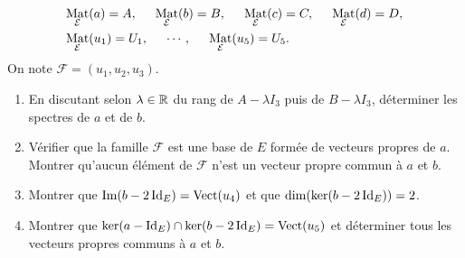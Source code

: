 \begin{align*}
&\mathop{\mathrm{Mat}}_{\mathcal E}(a) = A,\hspace{0.5cm} \mathop{\mathrm{Mat}}_{\mathcal E}(b) = B,\hspace{0.5cm}
\mathop{\mathrm{Mat}}_{\mathcal E}(c) = C,\hspace{0.5cm} \mathop{\mathrm{Mat}}_{\mathcal E}(d) = D,\; \\
&\mathop{\mathrm{Mat}}_{\mathcal E}(u_1) = U_1,\hspace{0.5cm}\cdots ,\hspace{0.5cm} \mathop{\mathrm{Mat}}_{\mathcal E}(u_5) = U_5.
\end{align*}
On note $\mathcal{F} = (u_1,u_2,u_3)$.
\begin{enumerate}
 \item En discutant selon $\lambda \in \mathbb{R}$ du rang de $A-\lambda I_3$ puis de $B-\lambda I_3$, déterminer les spectres de $a$ et de $b$.
 \item Vérifier que la famille $\mathcal{F}$ est une base de $E$ formée de vecteurs propres de $a$. Montrer qu'aucun élément de $\mathcal{F}$ n'est un vecteur propre commun à $a$ et $b$.
 \item Montrer que $\operatorname{Im}(b - 2\operatorname{Id}_E)=\operatorname{Vect}(u_4)$ et que $\dim(\ker(b - 2\operatorname{Id}_E))=2$.
 \item Montrer que $\ker(a-\operatorname{Id}_E)\cap \ker(b - 2\operatorname{Id}_E) = \operatorname{Vect}(u_5)$ et déterminer tous les vecteurs propres communs à $a$ et $b$.
\end{enumerate}

